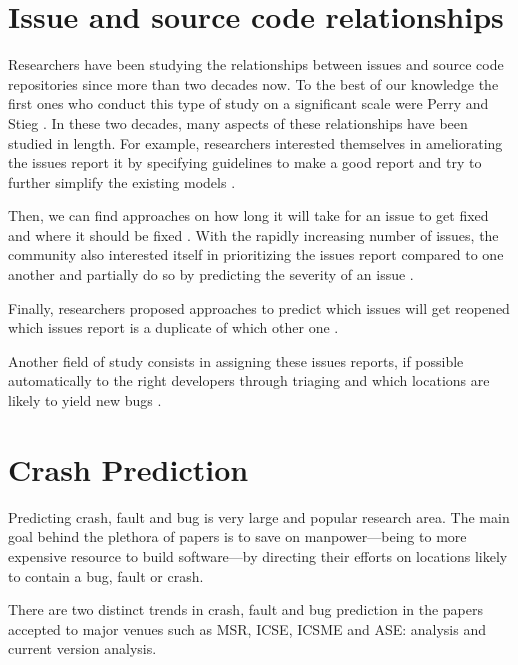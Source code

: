 \section{Issue and source code relationships\label{rel:issue-rela}}

Researchers have been studying the relationships between issues and source code repositories since more than two decades now.
To the best of our knowledge the first ones who conduct this type of study on a significant scale were Perry and Stieg \cite{PerryDewayneE.1993}.
In these two decades, many aspects of these relationships have been studied in length.
For example, researchers  interested themselves in ameliorating the issues report it by specifying guidelines to make a good report \cite{Bettenburg2008} and try to further simplify the existing models \cite{Herraiz2008}.

Then, we can find approaches on how long it will take for an issue to get fixed \cite{Bhattacharya2011,Zhang2013,Saha2014} and where it should be fixed \cite{Zhou2012,Kim2013a}.
With the rapidly increasing number of issues, the community also interested itself in prioritizing the issues report compared to one another \cite{Kim2011c} and partially do so by predicting the severity of an issue \cite{Lamkanfi2010}.

Finally, researchers proposed approaches to predict which issues will get reopened \cite{Zimmermann2012,Lo2013} which issues report is a duplicate of which other one \cite{Jalbert2008,Bettenburg2008a,Tian2012a}.

Another field of study consists in assigning these issues reports, if possible automatically to the right developers through triaging  \cite{Anvik2006,Jeong2009,Tamrawi2011a,Bortis2013}
and which locations are likely to yield new bugs \cite{Kim2006,Kim2007}.

\section{Crash Prediction}

Predicting crash, fault and bug is very large and popular research area.
The main goal behind the plethora of papers is to save on manpower---being to more expensive resource to build software---by directing their efforts on locations likely to contain a bug, fault or crash.

There are two distinct trends in crash, fault and bug prediction in the papers accepted to major venues such as MSR, ICSE, ICSME and ASE:  analysis and current version analysis.

